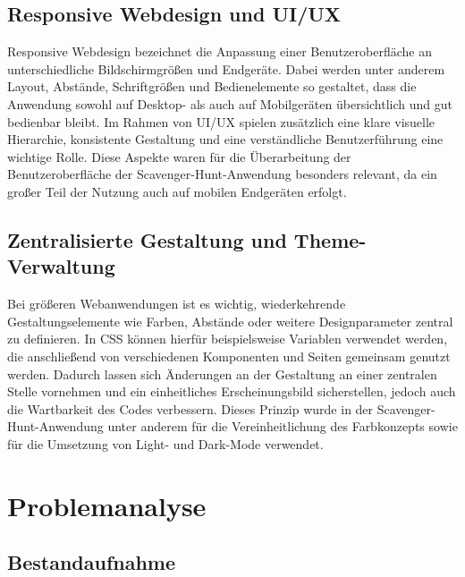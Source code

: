 ﻿\documentclass[oneside]{ausarbeitung}
\begin{document}
\autocite{jsQrDocs,mdnGetImageData}


\section{Responsive Webdesign und UI/UX}
\label{sec:responsive-ui-ux}

Responsive Webdesign bezeichnet die Anpassung einer Benutzeroberfläche an unterschiedliche Bildschirmgrößen und Endgeräte. Dabei werden unter anderem Layout, Abstände,
Schriftgrößen und Bedienelemente so gestaltet, dass die Anwendung sowohl auf Desktop- als auch auf Mobilgeräten übersichtlich und gut bedienbar bleibt. Im Rahmen von
UI/UX spielen zusätzlich eine klare visuelle Hierarchie, konsistente Gestaltung und eine verständliche Benutzerführung eine wichtige Rolle. Diese Aspekte waren für die
Überarbeitung der Benutzeroberfläche der Scavenger-Hunt-Anwendung besonders relevant, da ein großer Teil der Nutzung auch auf mobilen Endgeräten erfolgt.

\autocite{mdnResponsiveDesign}


\section{Zentralisierte Gestaltung und Theme-Verwaltung}
\label{sec:theme-verwaltung}

Bei größeren Webanwendungen ist es wichtig, wiederkehrende Gestaltungselemente wie Farben, Abstände oder weitere Designparameter zentral zu definieren. In CSS können
hierfür beispielsweise Variablen verwendet werden, die anschließend von verschiedenen Komponenten und Seiten gemeinsam genutzt werden. Dadurch lassen sich Änderungen an
der Gestaltung an einer zentralen Stelle vornehmen und ein einheitliches Erscheinungsbild sicherstellen, jedoch auch die Wartbarkeit des Codes verbessern. Dieses 
Prinzip wurde in der Scavenger-Hunt-Anwendung unter anderem für die Vereinheitlichung des Farbkonzepts sowie für die Umsetzung von Light- und Dark-Mode verwendet.

\autocite{mdnCssCustomProperties}



\chapter{Problemanalyse}
\label{cha:problemanalyse}


\section{Bestandaufnahme}
\label{sec:bestandaufnahme}
\end{document}
